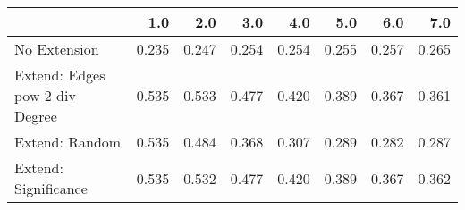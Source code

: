 \begin{tabular}{lrrrrrrr}
\toprule
{} &   1.0 &   2.0 &   3.0 &   4.0 &   5.0 &   6.0 &   7.0 \\
\midrule
No Extension                   & 0.235 & 0.247 & 0.254 & 0.254 & 0.255 & 0.257 & 0.265 \\
Extend: Edges pow 2 div Degree & 0.535 & 0.533 & 0.477 & 0.420 & 0.389 & 0.367 & 0.361 \\
Extend: Random                 & 0.535 & 0.484 & 0.368 & 0.307 & 0.289 & 0.282 & 0.287 \\
Extend: Significance           & 0.535 & 0.532 & 0.477 & 0.420 & 0.389 & 0.367 & 0.362 \\
\bottomrule
\end{tabular}
